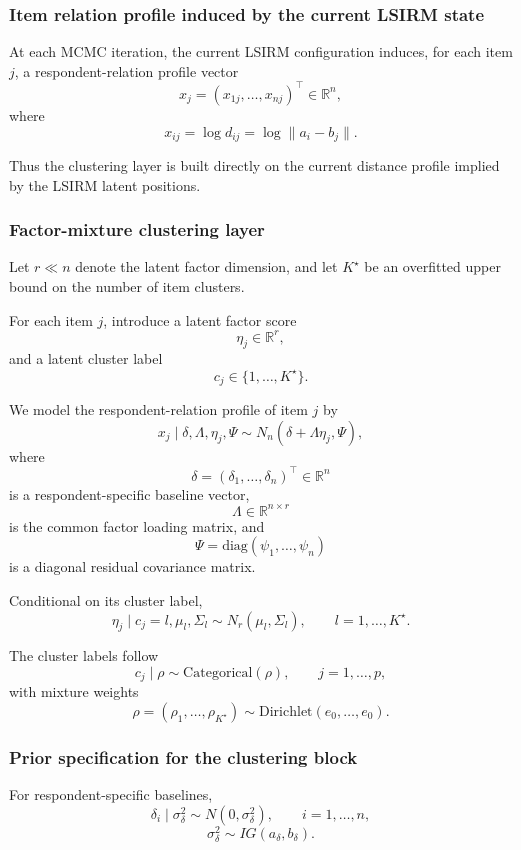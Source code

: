 \subsubsection{Item relation profile induced by the current LSIRM state}

At each MCMC iteration, the current LSIRM configuration induces, for each item $j$,
a respondent-relation profile vector
\[
x_j
=
(x_{1j},\dots,x_{nj})^\top \in \mathbb{R}^n,
\]
where
\[
x_{ij} = \log d_{ij} = \log \|a_i-b_j\|.
\]

Thus the clustering layer is built directly on the current distance profile implied by the
LSIRM latent positions.

\subsubsection{Factor-mixture clustering layer}

Let $r \ll n$ denote the latent factor dimension, and let $K^\star$ be an overfitted upper bound
on the number of item clusters.

For each item $j$, introduce a latent factor score
\[
\eta_j \in \mathbb{R}^r,
\]
and a latent cluster label
\[
c_j \in \{1,\dots,K^\star\}.
\]

We model the respondent-relation profile of item $j$ by
\[
x_j \mid \delta,\Lambda,\eta_j,\Psi
\sim
N_n(\delta + \Lambda \eta_j,\Psi),
\]
where
\[
\delta = (\delta_1,\dots,\delta_n)^\top \in \mathbb{R}^n
\]
is a respondent-specific baseline vector,
\[
\Lambda \in \mathbb{R}^{n\times r}
\]
is the common factor loading matrix,
and
\[
\Psi = \mathrm{diag}(\psi_1,\dots,\psi_n)
\]
is a diagonal residual covariance matrix.

Conditional on its cluster label,
\[
\eta_j \mid c_j=l,\mu_l,\Sigma_l
\sim
N_r(\mu_l,\Sigma_l),
\qquad
l=1,\dots,K^\star.
\]

The cluster labels follow
\[
c_j \mid \rho \sim \mathrm{Categorical}(\rho),
\qquad
j=1,\dots,p,
\]
with mixture weights
\[
\rho = (\rho_1,\dots,\rho_{K^\star}) \sim \mathrm{Dirichlet}(e_0,\dots,e_0).
\]

\subsubsection{Prior specification for the clustering block}

For respondent-specific baselines,
\[
\delta_i \mid \sigma_\delta^2 \sim N(0,\sigma_\delta^2),
\qquad
i=1,\dots,n,
\]
\[
\sigma_\delta^2 \sim IG(a_\delta,b_\delta).
\]

